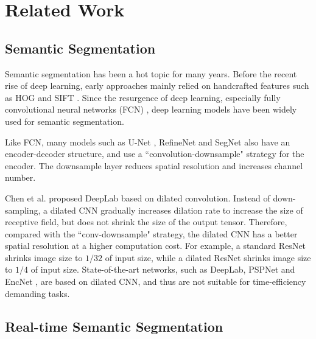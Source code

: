 \documentclass[10pt,twocolumn,letterpaper]{article}
\begin{document}
\section{Related Work}
\subsection{Semantic Segmentation}
Semantic segmentation has been a hot topic for many years. Before the recent rise of deep learning, early approaches mainly relied on handcrafted features such as HOG \cite{dalal2005histograms} and SIFT \cite{lowe2004distinctive}. Since the resurgence of deep learning, especially fully convolutional neural networks (FCN) \cite{long2015fully}, deep learning models have been widely used for semantic segmentation.



Like FCN, many models such as U-Net \cite{ronneberger2015u}, RefineNet \cite{lin2017refinenet} and SegNet \cite{badrinarayanan2015segnet} also have an encoder-decoder structure, and use a ``convolution-downsample" strategy for the encoder. The downsample layer reduces spatial resolution and increases channel number. 
  
 Chen et al. proposed DeepLab \cite{chen2016deeplab} based on dilated convolution. Instead of down-sampling, a dilated CNN gradually increases dilation rate to increase the size of receptive field, but does not shrink the size of the output tensor. Therefore, compared with the ``conv-downsample" strategy, the dilated CNN has a better spatial resolution at a higher computation cost. For example, a standard ResNet shrinks image size to $1/32$ of input size, while a dilated ResNet shrinks image size to $1/4$ of input size. State-of-the-art networks, such as DeepLab\cite{chen2016deeplab}, PSPNet \cite{zhao2017pyramid} and EncNet \cite{zhang2018context}, are based on dilated CNN, and thus are not suitable for time-efficiency demanding tasks.
 
\subsection{Real-time Semantic Segmentation}
\end{document}
